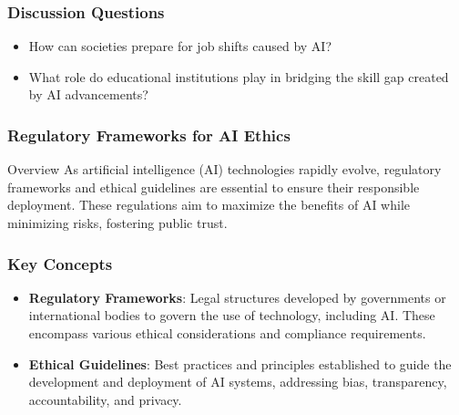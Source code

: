 \documentclass{beamer}
\begin{document}
\begin{frame}[fragile]
    \frametitle{Discussion Questions}
    \begin{itemize}
        \item How can societies prepare for job shifts caused by AI?
        \item What role do educational institutions play in bridging the skill gap created by AI advancements?
    \end{itemize}
\end{frame}

\begin{frame}[fragile]
    \frametitle{Regulatory Frameworks for AI Ethics}
    \begin{block}{Overview}
        As artificial intelligence (AI) technologies rapidly evolve, regulatory frameworks and ethical guidelines are essential to ensure their responsible deployment. These regulations aim to maximize the benefits of AI while minimizing risks, fostering public trust.
    \end{block}
\end{frame}

\begin{frame}[fragile]
    \frametitle{Key Concepts}
    \begin{itemize}
        \item \textbf{Regulatory Frameworks}: Legal structures developed by governments or international bodies to govern the use of technology, including AI. These encompass various ethical considerations and compliance requirements.
        \item \textbf{Ethical Guidelines}: Best practices and principles established to guide the development and deployment of AI systems, addressing bias, transparency, accountability, and privacy.
    \end{itemize}
\end{frame}
\end{document}
